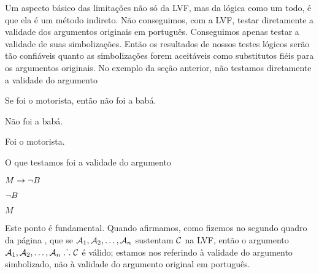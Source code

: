Um aspecto básico das limitações não só da LVF, mas da lógica como um todo, é que ela é um método indireto.
Não conseguimos, com a LVF, testar diretamente a validade dos argumentos originais em português.
Conseguimos apenas testar a validade de suas simbolizações.
Então os resultados de nossos testes lógicos serão tão confiáveis quanto as simbolizações forem aceitáveis como substitutos fiéis para os argumentos originais.
No exemplo da seção anterior, não testamos diretamente a validade do argumento
	\begin{earg}
		\item[] Se foi o motorista, então não foi a babá.
		\item[] Não foi a babá.
		\item[\therefore] Foi o motorista.
	\end{earg}
O que testamos foi a validade do argumento
	\begin{earg}
		\item[] $M \rightarrow \neg B$
		\item[] $\neg B$
		\item[\therefore] $M$
	\end{earg}

Este ponto é fundamental.
Quando afirmamos, como fizemos no segundo quadro da página \pageref{SusVal}, que se $\mathcal{A}_1, \mathcal{A}_2, \ldots, \mathcal{A}_n$ sustentam $\mathcal{C}$ na LVF, então o argumento  $\mathcal{A}_1, \mathcal{A}_2, \ldots, \mathcal{A}_n \mathrel{\ldotp\dot{}\,\ldotp} \mathcal{C}$ é  válido; estamos nos referindo à validade do argumento simbolizado, não à validade do argumento original em português.

